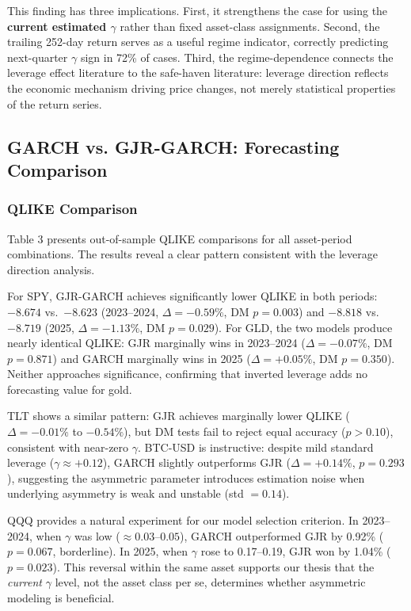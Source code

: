 This finding has three implications. First, it strengthens the case for using the \textbf{current estimated $\gamma$} rather than fixed asset-class assignments. Second, the trailing 252-day return serves as a useful regime indicator, correctly predicting next-quarter $\gamma$ sign in 72\% of cases. Third, the regime-dependence connects the leverage effect literature to the safe-haven literature: leverage direction reflects the economic mechanism driving price changes, not merely statistical properties of the return series.


\subsection{GARCH vs. GJR-GARCH: Forecasting Comparison}

\subsubsection{QLIKE Comparison}

Table 3 presents out-of-sample QLIKE comparisons for all asset-period combinations. The results reveal a clear pattern consistent with the leverage direction analysis.

For SPY, GJR-GARCH achieves significantly lower QLIKE in both periods: $-8.674$ vs.\ $-8.623$ (2023--2024, $\Delta = -0.59\%$, DM $p = 0.003$) and $-8.818$ vs.\ $-8.719$ (2025, $\Delta = -1.13\%$, DM $p = 0.029$). For GLD, the two models produce nearly identical QLIKE: GJR marginally wins in 2023--2024 ($\Delta = -0.07\%$, DM $p = 0.871$) and GARCH marginally wins in 2025 ($\Delta = +0.05\%$, DM $p = 0.350$). Neither approaches significance, confirming that inverted leverage adds no forecasting value for gold.

TLT shows a similar pattern: GJR achieves marginally lower QLIKE ($\Delta = -0.01\%$ to $-0.54\%$), but DM tests fail to reject equal accuracy ($p > 0.10$), consistent with near-zero $\gamma$. BTC-USD is instructive: despite mild standard leverage ($\gamma \approx +0.12$), GARCH slightly outperforms GJR ($\Delta = +0.14\%$, $p = 0.293$), suggesting the asymmetric parameter introduces estimation noise when underlying asymmetry is weak and unstable (std $= 0.14$).

QQQ provides a natural experiment for our model selection criterion. In 2023--2024, when $\gamma$ was low ($\approx 0.03$--$0.05$), GARCH outperformed GJR by 0.92\% ($p = 0.067$, borderline). In 2025, when $\gamma$ rose to 0.17--0.19, GJR won by 1.04\% ($p = 0.023$). This reversal within the same asset supports our thesis that the \textit{current} $\gamma$ level, not the asset class per se, determines whether asymmetric modeling is beneficial.

